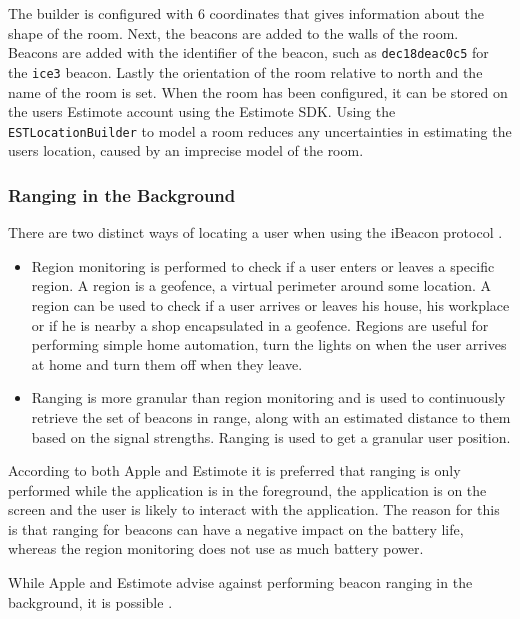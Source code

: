 The builder is configured with $6$ coordinates that gives information about the shape of the room. 
Next, the beacons are added to the walls of the room. 
Beacons are added with the identifier of the beacon, 
such as \texttt{dec18deac0c5} for the \texttt{ice3} beacon. 
Lastly the orientation of the room relative to north and the name of the room is set. 
When the room has been configured, 
it can be stored on the users Estimote account using the Estimote SDK.
Using the \texttt{ESTLocationBuilder} to model a room reduces any uncertainties in estimating the users location, 
caused by an imprecise model of the room.

\subsubsection{Ranging in the Background}

There are two distinct ways of locating a user when using the iBeacon protocol \cite{estimote:monitoring-ranging}.

\begin{itemize}
\item Region monitoring is performed to check if a user enters or leaves a specific region. A region is a geofence, \ie a virtual perimeter around some location. A region can be used to check if a user arrives or leaves his house, his workplace or if he is nearby a shop encapsulated in a geofence. Regions are useful for performing simple home automation, \eg turn the lights on when the user arrives at home and turn them off when they leave.
\item Ranging is more granular than region monitoring and is used to continuously retrieve the set of beacons in range, along with an estimated distance to them based on the signal strengths. Ranging is used to get a granular user position.
\end{itemize}

According to both Apple and Estimote it is preferred that ranging is only performed while the application is in the foreground, 
\ie the application is on the screen and the user is likely to interact with the application. 
The reason for this is that ranging for beacons can have a negative impact on the battery life, 
whereas the region monitoring does not use as much battery power.

While Apple and Estimote advise against performing beacon ranging in the background, it is possible \cite{apple:monitoring-ibeacon} \cite{estimote:monitoring-ranging}.

